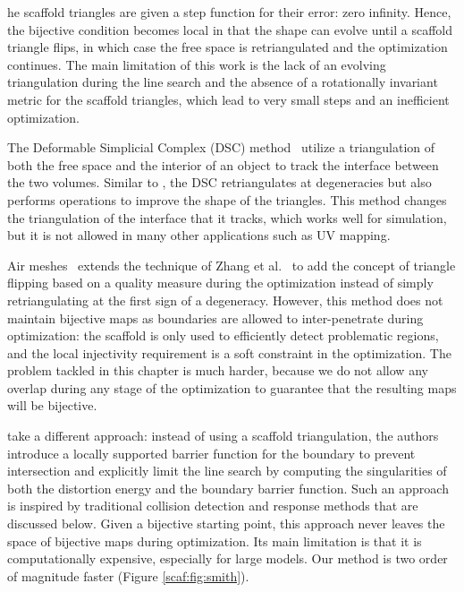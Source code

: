  he scaffold triangles are given a step function for their error: zero  infinity. Hence, the bijective condition becomes local in that the shape can evolve until a scaffold triangle flips, in which case the free space is retriangulated and the optimization continues. The main limitation of this work is the lack of an evolving triangulation during the line search and the absence of a rotationally invariant metric for the scaffold triangles, which lead to very small steps and an inefficient optimization.

The Deformable Simplicial Complex (DSC) method~\cite{Misztal:2012} utilize a triangulation of both the free space and the interior of an object to track the interface between the two volumes.  Similar to \cite{Zhang:2005}, the DSC retriangulates at degeneracies but also performs operations to improve the shape of the triangles.  This method changes the triangulation of the interface that it tracks, which works well for simulation, but it is not allowed in many other applications such as UV mapping.

Air meshes~\cite{Muller:2015} extends the technique of Zhang et al.~\cite{Zhang:2005} to add the concept of triangle flipping based on a quality measure during the optimization instead of simply retriangulating at the first sign of a degeneracy. However, this method does not maintain bijective maps as boundaries are allowed to inter-penetrate during optimization: the scaffold is only used to efficiently detect problematic regions, and the local injectivity requirement is a soft constraint in the optimization. The problem tackled in this chapter is much harder, because we do not allow any overlap during any stage of the optimization to guarantee that the resulting maps will be bijective.

\citep{Smith:2015} take a different approach: instead of using a scaffold triangulation, the authors introduce a locally supported barrier function for the boundary to prevent intersection and explicitly limit the line search by computing the singularities of both the distortion energy and the boundary barrier function. Such an approach is inspired by traditional collision detection and response methods that are discussed below. Given a  bijective starting point, this approach never leaves the space of bijective maps during optimization.  Its main limitation is that it is computationally expensive, especially for large models. Our method is two order of magnitude faster (Figure \ref{scaf:fig:smith}).


